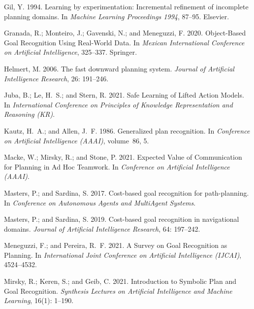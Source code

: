 \documentclass[letterpaper]{article} %
\begin{document}
\begin{thebibliography}{30}
Gil, Y. 1994.
\newblock Learning by experimentation: Incremental refinement of incomplete
  planning domains.
\newblock In \emph{Machine Learning Proceedings 1994}, 87--95. Elsevier.

Granada, R.; Monteiro, J.; Gavenski, N.; and Meneguzzi, F. 2020.
\newblock Object-Based Goal Recognition Using Real-World Data.
\newblock In \emph{Mexican International Conference on Artificial
  Intelligence}, 325--337. Springer.

Helmert, M. 2006.
\newblock The fast downward planning system.
\newblock \emph{Journal of Artificial Intelligence Research}, 26: 191--246.

Juba, B.; Le, H.~S.; and Stern, R. 2021.
\newblock Safe Learning of Lifted Action Models.
\newblock In \emph{International Conference on Principles of Knowledge
  Representation and Reasoning (KR)}.

Kautz, H.~A.; and Allen, J.~F. 1986.
\newblock Generalized plan recognition.
\newblock In \emph{Conference on Artificial Intelligence (AAAI)}, volume~86, 5.

Macke, W.; Mirsky, R.; and Stone, P. 2021.
\newblock Expected Value of Communication for Planning in Ad Hoc Teamwork.
\newblock In \emph{Conference on Artificial Intelligence (AAAI)}.

Masters, P.; and Sardina, S. 2017.
\newblock Cost-based goal recognition for path-planning.
\newblock In \emph{Conference on Autonomous Agents and MultiAgent Systems}.

Masters, P.; and Sardina, S. 2019.
\newblock Cost-based goal recognition in navigational domains.
\newblock \emph{Journal of Artificial Intelligence Research}, 64: 197--242.

Meneguzzi, F.; and Pereira, R.~F. 2021.
\newblock A Survey on Goal Recognition as Planning.
\newblock In \emph{International Joint Conference on Artificial Intelligence
  ({IJCAI})}, 4524--4532.

Mirsky, R.; Keren, S.; and Geib, C. 2021.
\newblock Introduction to Symbolic Plan and Goal Recognition.
\newblock \emph{Synthesis Lectures on Artificial Intelligence and Machine
  Learning}, 16(1): 1--190.


\end{thebibliography}
\end{document}
